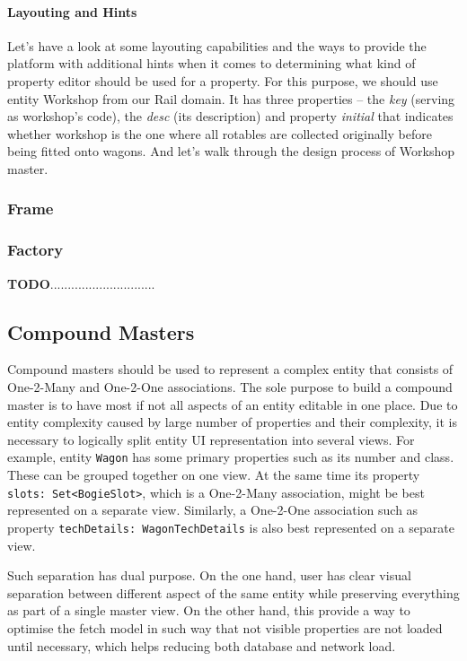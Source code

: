   \paragraph{Layouting and Hints}
  
  Let's have a look at some layouting capabilities and the ways to provide the platform with additional hints when it comes to determining what kind of property editor should be used for a property.
  For this purpose, we should use entity Workshop from our Rail domain.
  It has three properties -- the \emph{key} (serving as workshop's code), the \emph{desc} (its description) and property \emph{initial} that indicates whether workshop is the one where all rotables are collected originally before being fitted onto wagons.
  And let's walk through the design process of Workshop master.
  
  \subsubsection{Frame}
  
  \subsubsection{Factory}  
  
  
  \textbf{TODO}..............................
  
\subsection{Compound Masters}

  Compound masters should be used to represent a complex entity that consists of One-2-Many and One-2-One associations.
  The sole purpose to build a compound master is to have most if not all aspects of an entity editable in one place.
  Due to entity complexity caused by large number of properties and their complexity, it is necessary to logically split entity UI representation into several views.
  For example, entity \texttt{Wagon} has some primary properties such as its number and class.
  These can be grouped together on one view.
  At the same time its property \texttt{slots: Set<BogieSlot>}, which is a One-2-Many association, might be best represented on a separate view.
  Similarly, a One-2-One association such as property \texttt{techDetails: WagonTechDetails} is also best represented on a separate view.
  
  Such separation has dual purpose.
  On the one hand, user has clear visual separation between different aspect of the same entity while preserving everything as part of a single master view.
  On the other hand, this provide a way to optimise the fetch model in such way that not visible properties are not loaded until necessary, which helps reducing both database and network load.
  
